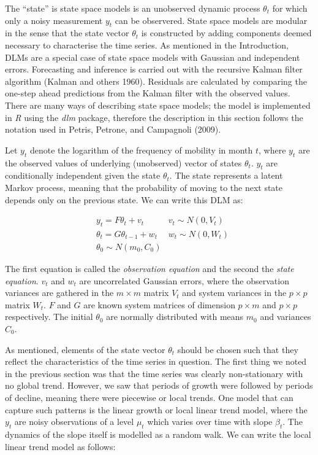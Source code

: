 \documentclass[]{article}
\begin{document}
The ``state'' is state space models is an unobserved dynamic process
\(\theta_{t}\) for which only a noisy measurement \(y_{t}\) can be
observered. State space models are modular in the sense that the state
vector \(\theta_{t}\) is constructed by adding components deemed
necessary to characterise the time series. As mentioned in the
Introduction, DLMs are a special case of state space models with
Gaussian and independent errors. Forecasting and inference is carried
out with the recursive Kalman filter algorithm (Kalman and others 1960).
Residuals are calculated by comparing the one-step ahead predictions
from the Kalman filter with the observed values. There are many ways of
describing state space models; the model is implemented in \emph{R}
using the \emph{dlm} package, therefore the description in this section
follows the notation used in Petris, Petrone, and Campagnoli (2009).

Let \(y_{t}\) denote the logarithm of the frequency of mobility in month
\(t\), where \(y_{t}\) are the observed values of underlying
(unobserved) vector of states \(\theta_{t}\). \(y_{t}\) are
conditionally independent given the state \(\theta_{t}\). The state
represents a latent Markov process, meaning that the probability of
moving to the next state depends only on the previous state. We can
write this DLM as:

\[
\begin{aligned}
& y_{t} = F \theta_{t} + v_{t} & v_{t} \sim N(0, V_{t}) \\
& \theta_{t} = G \theta_{t-1} + w_{t} &w_{t} \sim N(0, W_{t}) \\
& \theta_{0} \sim N(m_{0}, C_{0})
\end{aligned}
\]

The first equation is called the \emph{observation equation} and the
second the \emph{state equation}. \(v_{t}\) and \(w_{t}\) are
uncorrelated Gaussian errors, where the observation variances are
gathered in the \(m \times m\) matrix \(V_{t}\) and system variances in
the \(p \times p\) matrix \(W_{t}\). \(F\) and \(G\) are known system
matrices of dimension \(p \times m\) and \(p \times p\) respectively.
The initial \(\theta_{0}\) are normally distributed with means \(m_{0}\)
and variances \(C_{0}\).

As mentioned, elements of the state vector \(\theta_{t}\) should be
chosen such that they reflect the characteristics of the time series in
question. The first thing we noted in the previous section was that the
time series was clearly non-stationary with no global trend. However, we
saw that periods of growth were followed by periods of decline, meaning
there were piecewise or local trends. One model that can capture such
patterns is the linear growth or local linear trend model, where the
\(y_{t}\) are noisy observations of a level \(\mu_{t}\) which varies
over time with slope \(\beta_{t}\). The dynamics of the slope itself is
modelled as a random walk. We can write the local linear trend model as
follows:
\end{document}
